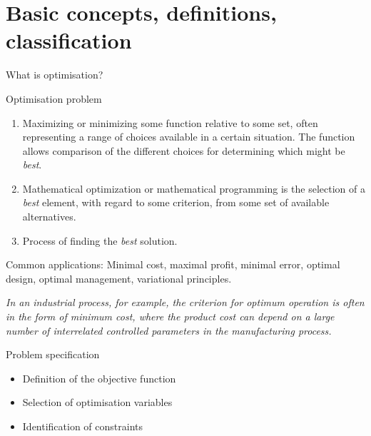 \documentclass[10pt,aspectratio=169,notes]{beamer} %
\begin{document}
\section{Basic concepts, definitions, classification}
\begin{frame}[label=frame2]{What is optimisation?}
\begin{alertblock}{Optimisation problem}
	\begin{enumerate}
		\item Maximizing or minimizing some function relative to some set,
often representing a range of choices available in a certain situation. 
		The function
allows comparison of the different choices for determining which might be \emph{best}.
		\item Mathematical optimization or mathematical programming is the selection of a \emph{best} element, with regard to some criterion, from some set of available alternatives.
		\item Process of finding the \emph{best} solution.
	\end{enumerate}
	
\end{alertblock}

Common applications: Minimal cost, maximal profit, minimal error, optimal design,
optimal management, variational principles.


\emph{In an industrial process, for example, the criterion for
optimum operation is often in the form of minimum cost,
where the product cost can depend on a large number of
interrelated controlled parameters in the manufacturing
process.}
\begin{biblio}{}
\end{biblio}
\end{frame}
\note{}
\begin{frame}{Problem specification}
\begin{itemize}
	\item Definition of the objective function
	\item Selection of optimisation variables
	\item Identification of constraints
\end{itemize}	
\end{frame}
\end{document}
